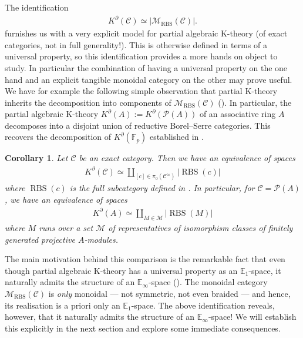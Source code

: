 \documentclass[12pt, reqno]{amsart}
\theoremstyle{plain}
\newtheorem{corollary}[theorem]{Corollary}
\theoremstyle{definition}
\newcommand{\F}{\mathbb F}
\begin{document}
The identification
\begin{align*}
K^\partial(\mathcal{C})\simeq |\mathscr{M}_{\operatorname{RBS}}(\mathcal{C})|.
\end{align*}
furnishes us with a very explicit model for partial algebraic K-theory (of exact categories, not in full generality!). This is otherwise defined in terms of a universal property, so this identification provides a more hands on object to study. In particular the combination of having a universal property on the one hand and an explicit tangible monoidal category on the other may prove useful. We have for example the following simple observation that partial K-theory inherits the decomposition into components of $\mathscr{M}_{\operatorname{RBS}}(\mathcal{C})$ (). In particular, the partial algebraic K-theory $K^\partial(A):=K^\partial(\mathcal{P}(A))$ of an associative ring $A$ decomposes into a disjoint union of reductive Borel--Serre categories. This recovers the decomposition of $K^\partial(\F_p)$ established in \cite[\S 5.2]{Yuan}.

\begin{corollary}
Let $\mathcal{C}$ be an exact category. Then we have an equivalence of spaces
\begin{align*}
K^\partial(\mathcal{C})\simeq \coprod_{[c]\in \pi_0(\mathcal{C}^\simeq)} |\operatorname{RBS}(c)|
\end{align*}
where $\operatorname{RBS}(c)$ is the full subcategory defined in . In particular, for $\mathcal{C}=\mathcal{P}(A)$, we have an equivalence of spaces
\begin{align*}
K^\partial(A)\simeq \coprod_{M\in \mathcal{M}} |\operatorname{RBS}(M)|
\end{align*}
where $M$ runs over a set $\mathcal{M}$ of representatives of isomorphism classes of finitely generated projective $A$-modules.
\end{corollary}

The main motivation behind this comparison is the remarkable fact that even though partial algebraic K-theory has a universal property as an $\mathbb{E}_1$-space, it naturally admits the structure of an $\mathbb{E}_\infty$-space (\cite[Corollary 4.9.1]{Yuan}). The monoidal category $\mathscr{M}_{\operatorname{RBS}}(\mathcal{C})$ is \textit{only} monoidal --- not symmetric, not even braided --- and hence, its realisation is a priori only an $\mathbb{E}_1$-space. The above identification reveals, however, that it naturally admits the structure of an $\mathbb{E}_\infty$-space! We will establish this explicitly in the next section and explore some immediate consequences.
\end{document}
